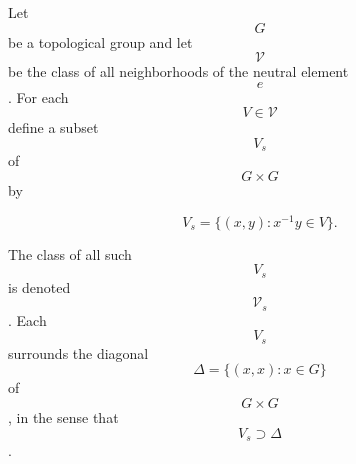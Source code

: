Let $$G$$ be a topological group and let $$\mathcal{V}$$ be the class of all neighborhoods of the neutral element $$e$$. For each $$V \in \mathcal{V}$$ define a subset $$V_s$$ of $$G \times G$$ by

$$V_s = \{(x, y) : x^{-1}y \in V\}.$$

The class of all such $$V_s$$ is denoted $$\mathcal{V}_s$$. Each $$V_s$$ surrounds the diagonal $$\Delta = \{(x, x) : x \in G\}$$ of $$G \times G$$, in the sense that $$V_s \supset \Delta$$.
